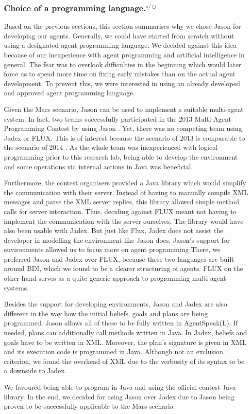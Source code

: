 \subsubsection[Choice of a programming language.]{Choice of a programming language.$^{\circ/\odot}$}\label{fun:apl_choice}
Based on the previous sections, this section summarises why we chose Jason for developing our agents.
Generally, we could have started from scratch without using a designated agent programming language.
We decided against this idea because of our inexperience with agent programming and artificial intelligence in general.
The fear was to overlook difficulties in the beginning which would later force us to spend more time on fixing early mistakes than on the actual agent development.
To prevent this, we were interested in using an already developed and approved agent programming language.

Given the Mars scenario, Jason can be used to implement a suitable multi-agent system.
In fact, two teams successfully participated in the 2013 Multi-Agent Programming Contest by using Jason \cite{ahlbrecht_multi_2013}. %
Yet, there was no competing team using Jadex or FLUX.
This is of interest because the scenario of 2013 is comparable to the scenario of 2014 \cite{ahlbrecht_mapc_2014}. %
As the whole team was inexperienced with logical programming prior to this research lab, being able to develop the environment and some operations via internal actions in Java was beneficial.

Furthermore, the contest organisers provided a Java library which would simplify the communication with their server.
Instead of having to manually compile XML messages and parse the XML server replies, this library allowed simple method calls for server interaction.
Thus, deciding against FLUX meant not having to implement the communication with the server ourselves.
The library would have also been usable with Jadex.
But just like Flux, Jadex does not assist the developer in modelling the environment like Jason does.
Jason's support for environments allowed us to focus more on agent programming
There, we preferred Jason and Jadex over FLUX, because these two languages are built around BDI, which we found to be a clearer structuring of agents.
FLUX on the other hand serves as a quite generic approach to programming multi-agent systems.

Besides the support for developing environments, Jason and Jadex are also different in the way how the initial beliefs, goals and plans are being programmed.
Jason allows all of these to be fully written in AgentSpeak(L).
If needed, plans can additionally call methods written in Java.
In Jadex, beliefs and goals have to be written in XML.
Moreover, the plan's signature is given in XML and its execution code is programmed in Java.
Although not an exclusion criterion, we found the overhead of XML due to the verbosity of its syntax to be a downside to Jadex.

We favoured being able to program in Java and using the official contest Java library.
In the end, we decided for using Jason over Jadex due to Jason being proven to be successfully applicable to the Mars scenario.
